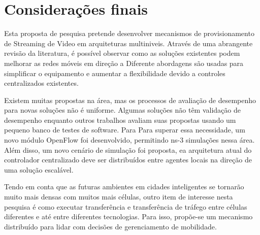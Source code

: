 \clearpage
\section{Considerações finais}
\label{ch:remarks}

Esta proposta de pesquisa pretende desenvolver mecanismos de provisionamento de Streaming de Video em 
arquiteturas multiniveis. Através de uma abrangente revisão da literatura, é possível observar como as soluções existentes podem melhorar as redes móveis em direção a
Diferente abordagens são usadas para simplificar o equipamento e aumentar a flexibilidade devido a controles centralizados existentes.

Existem muitas propostas na área, mas os processos de avaliação de desempenho
para novas soluções não é uniforme. Algumas soluções não têm validação de desempenho
enquanto outros trabalhos avaliam suas propostas usando um pequeno banco de testes de software. Para
Para superar essa necessidade, um novo módulo OpenFlow foi desenvolvido, permitindo ns-3
simulações nessa área. Além disso, um novo cenário de simulação foi
proposta, ea arquitetura atual do controlador centralizado deve ser
distribuídos entre agentes locais na direção de uma solução escalável.

Tendo em conta que as futuras ambientes em cidades inteligentes se tornarão muito mais densas com muitos
mais células, outro item de interesse nesta pesquisa é como executar
transferência e transferência de tráfego entre células diferentes e até entre
diferentes tecnologias. Para isso, propõe-se um mecanismo distribuído para
lidar com decisões de gerenciamento de mobilidade.


